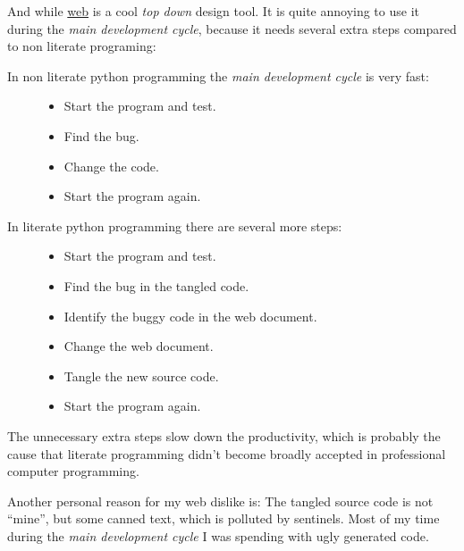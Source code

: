 \documentclass[letterpaper,10pt,english]{sphinxmanual}
\begin{document}
And while \href{http://en.wikipedia.org/wiki/WEB}{web} is a cool \emph{top down} design tool. It is quite annoying to use it
during the \emph{main development cycle}, because it needs several extra steps compared
to non literate programing:
\begin{description}
\item[{In non literate python programming the \emph{main development cycle} is very fast:}] \leavevmode\begin{itemize}
\item {} 
Start the program and test.

\item {} 
Find the bug.

\item {} 
Change the code.

\item {} 
Start the program again.

\end{itemize}

\item[{In literate python programming there are several more steps:}] \leavevmode\begin{itemize}
\item {} 
Start the program and test.

\item {} 
Find the bug in the tangled code.

\item {} 
Identify the buggy code in the web document.

\item {} 
Change the web document.

\item {} 
Tangle the new source code.

\item {} 
Start the program again.

\end{itemize}

\end{description}

The unnecessary extra steps slow down the productivity, which is probably
the cause that literate programming didn't become broadly accepted in
professional computer programming.

Another personal reason for my web dislike is: The tangled source code is not ``mine'',
but some canned text, which is polluted by sentinels. Most of my time during
the \emph{main development cycle} I was spending with ugly generated code.
\end{document}
